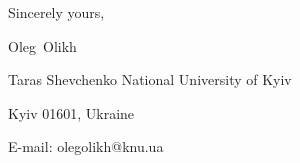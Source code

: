 \documentclass[preprint]{elsarticle}
\begin{document}
%


\vspace{3mm}

Sincerely yours,

Oleg~Olikh


Taras Shevchenko National University of Kyiv


Kyiv 01601, Ukraine

E-mail: olegolikh@knu.ua


\end{document}
